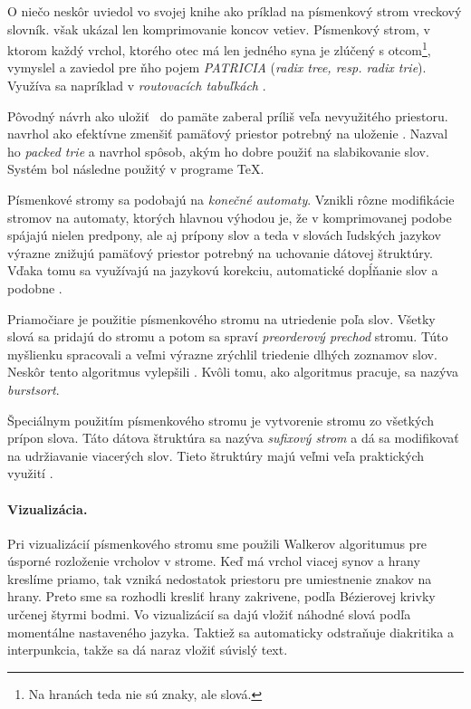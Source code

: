 O niečo neskôr \citet{knuth} uviedol vo svojej knihe ako príklad na 
písmenkový strom vreckový slovník. 
\citet{knuth} však ukázal len komprimovanie koncov vetiev. Písmenkový 
strom, v ktorom každý vrchol, ktorého otec má len jedného syna 
je zlúčený s otcom\footnote{Na hranách teda nie sú znaky, ale slová.}, 
vymyslel \citet{patricia} a zaviedol pre ňho pojem \emph{PATRICIA} 
(\emph{radix tree, resp. radix trie}). Využíva sa napríklad v 
\emph{routovacích tabuľkách} \citep{radix}.

Pôvodný návrh \citep{fredkin} ako uložiť \trie\ do pamäte zaberal príliš 
veľa nevyužitého priestoru. \citet{liang} navrhol ako efektívne zmenšiť 
pamäťový priestor potrebný na uloženie \trie. Nazval ho \emph{packed trie} 
a navrhol spôsob, akým ho dobre použiť na slabikovanie slov. Systém bol 
následne použitý v programe \TeX. 

Písmenkové stromy sa podobajú na \emph{konečné automaty}. 
Vznikli rôzne modifikácie stromov na automaty, ktorých hlavnou výhodou je, 
že v komprimovanej podobe spájajú nielen predpony, ale aj prípony slov 
a teda v slovách ľudských jazykov výrazne znižujú pamäťový priestor potrebný 
na uchovanie dátovej štruktúry. Vďaka tomu sa využívajú na jazykovú korekciu, 
automatické dopĺňanie slov a podobne \citep{scrabble,ca}. 

Priamočiare je použitie písmenkového stromu na utriedenie poľa slov. 
Všetky slová sa pridajú do stromu a potom sa spraví \emph{preorderový prechod} 
stromu. Túto myšlienku spracovali \citet{burstsort1} a veľmi výrazne zrýchlil 
triedenie dlhých zoznamov slov. Neskôr tento algoritmus vylepšili 
\citet{burstsort2}. Kvôli tomu, ako algoritmus pracuje, 
sa nazýva \emph{burstsort}.

Špeciálnym použitím písmenkového stromu je vytvorenie stromu zo všetkých 
prípon slova. Táto dátova štruktúra sa nazýva \emph{sufixový strom} a dá sa 
mo\-di\-fi\-ko\-vať na udržiavanie viacerých slov. Tieto štruktúry majú 
veľmi veľa praktických využití \citep{gusfield}. 

\paragraph{Vizualizácia.} Pri vizualizácií písmenkového stromu sme použili 
Walkerov algoritumus pre úsporné rozloženie vrcholov v strome. 
\citep{walker} Keď má vrchol viacej synov a hrany kreslíme priamo, tak vzniká 
nedostatok priestoru pre umiestnenie znakov na hrany. Preto sme sa rozhodli 
kresliť hrany zakrivene, podľa Bézierovej krivky určenej štyrmi bodmi. 
Vo vizualizácií sa dajú vložiť náhodné slová podľa momentálne nastaveného 
jazyka. Taktiež sa automaticky odstraňuje diakritika a interpunkcia, takže 
sa dá naraz vložiť súvislý text.
